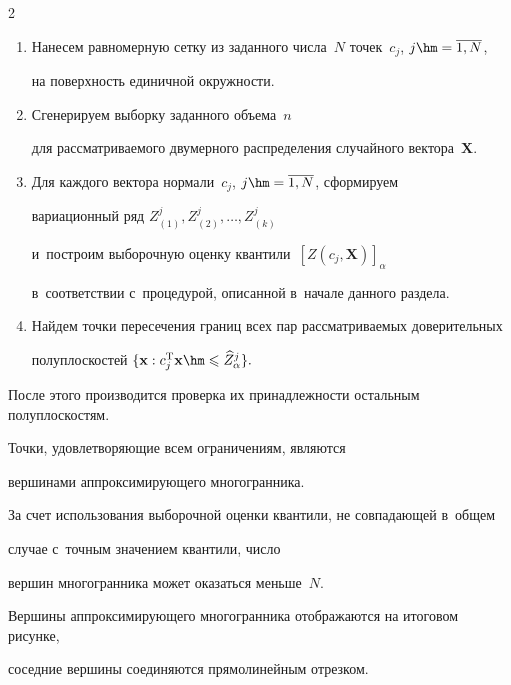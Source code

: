 \begin{multicols}{2}
\begin{enumerate}[1.]
\item  Нанесем равномерную сетку из заданного чис\-ла~$N$ точек~$c_j$, $j\hm=\overline{1,N}$, 

на по\-верх\-ность единичной окруж\-ности.





\item  Сгенерируем выборку заданного объема~$n$ 

для рас\-смат\-ри\-ва\-емо\-го двумерного распределения случайного вектора~$\mathbf{X}.$



\item  Для каждого вектора нормали~$c_j$,  $j\hm=\overline{1,N}$, сформируем 

вариационный ряд $Z_{(1)}^j, Z_{(2)}^j, \ldots, Z_{(k)}^j$

и~построим выборочную оценку квантили~$[Z(c_j,\mathbf X)]_\alpha$

в~соответствии с~процедурой, описанной в~начале данного раздела.



\item  Найдем точки пересечения границ всех пар рас\-смат\-ри\-ва\-емых доверительных 

полуплоскостей $\{ \mathbf {x}: c_j^{\mathrm{T}} \mathbf {x} \hm\leqslant  

\widehat  {Z}^j_\alpha\}.$



\end{enumerate}



После этого производится проверка их принадлежности остальным по\-лу\-плос\-костям.

 Точки, удовле\-тво\-ря\-ющие всем ограничениям, яв\-ля\-ют\-ся

 вершинами аппроксимирующего многогранника.\linebreak

За счет использования выборочной оценки кван\-тили, не совпадающей в~общем 

случае с~точ\-ным значением квантили, чис\-ло

вершин многогранника может оказаться меньше~$N$.

Вершины аппроксимирующего многогранника отображаются на итоговом рисунке, 

со\-сед\-ние вершины соединяются прямолинейным отрезком.




\end{multicols}
